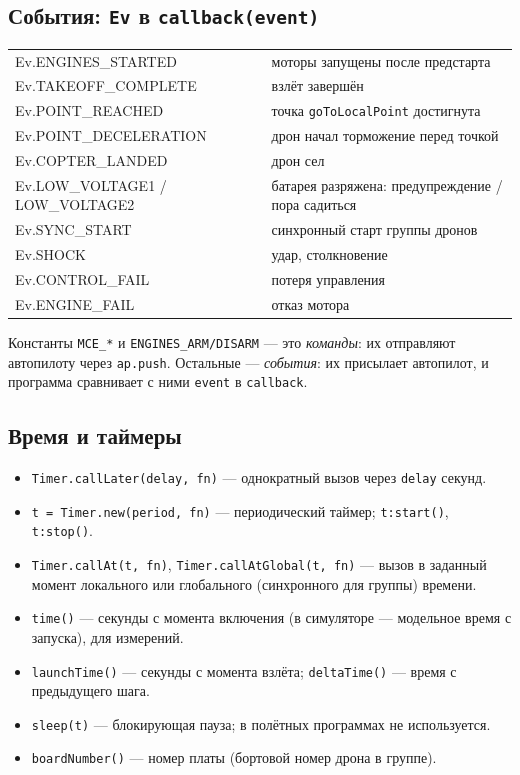 \subsection{События: \texttt{Ev} в \texttt{callback(event)}}
\begin{center}\small
\begin{tabularx}{\linewidth}{@{}>{\ttfamily}l X@{}}
\toprule
Ev.ENGINES\_STARTED & моторы запущены после предстарта \\
Ev.TAKEOFF\_COMPLETE & взлёт завершён \\
Ev.POINT\_REACHED & точка \texttt{goToLocalPoint} достигнута \\
Ev.POINT\_DECELERATION & дрон начал торможение перед точкой \\
Ev.COPTER\_LANDED & дрон сел \\
Ev.LOW\_VOLTAGE1 / LOW\_VOLTAGE2 & батарея разряжена: предупреждение / пора садиться \\
Ev.SYNC\_START & синхронный старт группы дронов \\
Ev.SHOCK & удар, столкновение \\
Ev.CONTROL\_FAIL & потеря управления \\
Ev.ENGINE\_FAIL & отказ мотора \\
\bottomrule
\end{tabularx}
\end{center}
Константы \texttt{MCE\_*} и \texttt{ENGINES\_ARM/DISARM} --- это \emph{команды}: их отправляют автопилоту через \texttt{ap.push}. Остальные --- \emph{события}: их присылает автопилот, и программа сравнивает с ними \texttt{event} в \texttt{callback}.

\subsection{Время и таймеры}
\begin{itemize}
  \item \verb|Timer.callLater(delay, fn)| --- однократный вызов через \verb|delay| секунд.
  \item \verb|t = Timer.new(period, fn)| --- периодический таймер; \verb|t:start()|, \verb|t:stop()|.
  \item \verb|Timer.callAt(t, fn)|, \verb|Timer.callAtGlobal(t, fn)| --- вызов в заданный момент локального или глобального (синхронного для группы) времени.
  \item \verb|time()| --- секунды с момента включения (в симуляторе --- модельное время с запуска), для измерений.
  \item \verb|launchTime()| --- секунды с момента взлёта; \verb|deltaTime()| --- время с предыдущего шага.
  \item \verb|sleep(t)| --- блокирующая пауза; в полётных программах не используется.
  \item \verb|boardNumber()| --- номер платы (бортовой номер дрона в группе).
\end{itemize}

